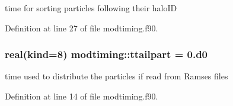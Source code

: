 time for sorting particles following their halo\+ID 



Definition at line 27 of file modtiming.\+f90.

\subsubsection[{\texorpdfstring{ttailpart}{ttailpart}}]{\setlength{\rightskip}{0pt plus 5cm}real(kind=8) modtiming\+::ttailpart = 0.d0}\hypertarget{namespacemodtiming_a65a8925f0685c0a5c5e42b0afd3b4a69}{}\label{namespacemodtiming_a65a8925f0685c0a5c5e42b0afd3b4a69}


time used to distribute the particles if read from Ramses files 



Definition at line 14 of file modtiming.\+f90.

